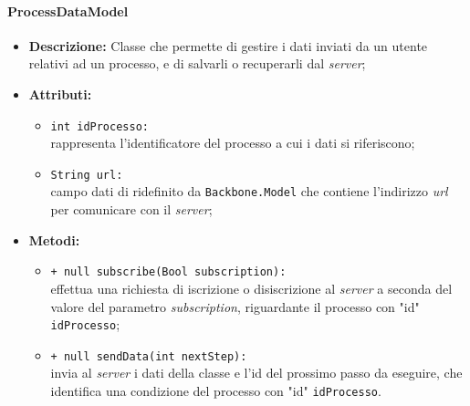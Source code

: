 \paragraph{ProcessDataModel}
\label{processDataModel}
\begin{flushleft}
\begin{itemize}
\item \textbf{Descrizione:} Classe che permette di gestire i dati inviati da un utente relativi ad un processo, e di salvarli o recuperarli dal \textit{server};
\item \textbf{Attributi:}
\begin{sloppypar}
\begin{itemize}
\item \texttt{int idProcesso:}\\ rappresenta l'identificatore del processo a cui i dati si riferiscono;
\item \texttt{String url:}\\ campo dati di ridefinito da \texttt{Backbone.Model} che contiene l'indirizzo \textit{url} per comunicare con il \textit{server};
\end{itemize}
\end{sloppypar}
\item \textbf{Metodi:}
\begin{sloppypar}
\begin{itemize}
\item \texttt{+ null subscribe(Bool subscription):}\\ effettua una richiesta di iscrizione o disiscrizione al \textit{server} a seconda del valore del parametro \textit{subscription}, riguardante il processo con "id" \texttt{idProcesso};
\item \texttt{+ null sendData(int nextStep):}\\ invia al \textit{server} i dati della classe e l'id del prossimo passo da eseguire, che identifica una condizione del processo con "id" \texttt{idProcesso}.
\end{itemize}
\end{sloppypar}
\end{itemize}
\end{flushleft}

